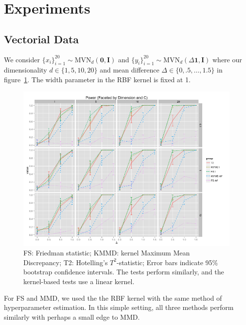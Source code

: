 \section{Experiments}
\subsection{Vectorial Data}
We consider $\{x_i\}_{i=1}^{20} \sim \mathrm{MVN}_d(\mathbf{0},
\mathbf{I})$ and $\{y_i\}_{i=1}^{20} \sim
\mathrm{MVN}_d(\Delta \mathbf{1}, \mathbf{I})$ where our
dimensionality $d \in \{1, 5, 10, 20\}$ and mean difference $\Delta \in
\{0, .5, \ldots, 1.5\}$ in figure~\ref{fig:power_normal}.  The width
parameter in the RBF kernel is fixed at 1.

\begin{figure}
  \centering
  \includegraphics[width=\linewidth]{power_normal.png}
  \caption{FS: Friedman statistic; KMMD: kernel Maximum Mean
    Discrepancy; T2: Hotelling's $T^2$-statistic; Error bars indicate
    95\% bootstrap confidence intervals.  The tests perform similarly,
    and the kernel-based tests use a linear kernel.}
  \label{fig:power_normal}
\end{figure}

For FS and MMD, we used the the RBF kernel with the same method of
hyperparameter estimation.  In this simple setting, all three methods
perform similarly with perhaps a small edge to MMD.

